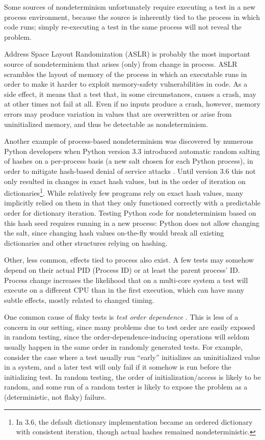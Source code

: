 \label{sec:pnondet}

Some sources of nondeterminism unfortunately require executing a test in a new
process environment, because the source is inherently tied to the
process in which code runs; simply re-executing a test in the same
process will not reveal the problem.

Address Space Layout Randomization (ASLR) \cite{ASLR}  is probably the most
important source of nondeterminism that arises (only) from change in
process.  ASLR scrambles the layout of memory of the process in which
an executable runs in order to make it harder to exploit memory-safety
vulnerabilities in code.  As a side effect, it
means that a test that, in some circumstances, causes a crash, may at
other times not fail at all.  Even if no inputs produce a crash,
however, memory errors may produce variation in values that are
overwritten or arise from uninitialized memory, and thus be detectable
as nondeterminism.

Another example of process-based nondeterminism was discovered by numerous Python developers when Python
version 3.3 introduced automatic random salting of hashes on a
per-process basis (a new salt chosen for each Python process),
in order to mitigate hash-based denial of service attacks
\cite{denial}.  Until version 3.6 this not only resulted in changes in
exact hash values, but in the order of iteration on
dictionaries\footnote{In 3.6, the default dictionary
  implementation became an ordered dictionary with consistent
  iteration, though actual hashes remained nondeterministic.}.  While
relatively few programs rely on exact hash values, many implicitly
relied on them in that they only functioned correctly with a
predictable order for dictionary iteration.  Testing
Python code for nondeterminism based on this hash seed requires
running in a new process:  Python does not allow changing the salt, since changing hash values on-the-fly would
break all existing dictionaries and other structures relying on
hashing.

Other, less common, effects tied to process also exist.  A few tests
may somehow depend on their actual PID (Process ID) or at least the
parent process' ID.  Process change increases the likelihood that on a multi-core
system a test will execute on a different CPU than in the first
execution, which can have many subtle effects, mostly related to
changed timing.

One common cause of flaky tests is \emph{test order dependence} \cite{idflakies}.  This
is less of a concern in our setting, since many problems due to test
order are easily exposed in random testing, since the
order-dependence-inducing operations will seldom usually happen in the
same order in randomly generated tests.  For example, consider the
case where a test usually run ``early'' initializes an uninitialized
value in a system, and a later test will only fail if it somehow is
run before the initializing test.  In random testing, the order of
initialization/access is likely to be random, and some run of a random
tester is likely to expose the problem as a (deterministic, not flaky) failure.

